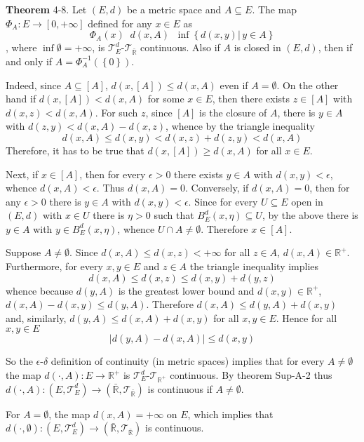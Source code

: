 \documentclass[a4paper]{article}
\newcommand{\obj}[1]{\left\{ #1 \right \}}
\newcommand{\clo}[1]{\left [ #1 \right ]}
\newcommand{\brac}[1]{\left ( #1 \right )}
\newcommand{\induc}[1]{\left . #1 \right \vert}
\newcommand{\abs}[1]{\left | #1 \right |}
\newcommand{\Rbar}{{\bar{\mathbb{R}}}}
\newcommand{\Real}{\mathbb{R}}
\newcommand{\Zinf}{\clo{ 0, +\infty }}
\newcommand{\Tcal}{\mathcal{T}}
\newcommand{\defn}{\mathop{\overset{\Delta}{=}}\nolimits}
\begin{document}
\label{thm:set_dist} \noindent \textbf{Theorem} 4-8.
Let $\brac{E,d}$ be a metric space and $A\subseteq E$. The map $\Phi_A:E\to \Zinf$ defined for any $x\in E$ as \[\Phi_A\brac{x}\defn d\brac{x,A}\defn \inf\obj{\induc{d\brac{x,y}}\,y\in A}\], where $\inf \emptyset = +\infty$, is $\Tcal_E^d$-$\Tcal_\Rbar$ continuous. Also if $A$ is closed in $\brac{E, d}$, then if and only if $A=\Phi_A^{-1}\brac{\obj{0}}$.

Indeed, since $A\subseteq \clo{A}$, $d\brac{x,\clo{A}}\leq d\brac{x,A}$ even if $A=\emptyset$. On the other hand if $d\brac{x,\clo{A}} < d\brac{x,A}$ for some $x\in E$, then there exists $z\in\clo{A}$ with $d\brac{x,z}<d\brac{x,A}$. For such $z$, since $\clo{A}$ is the closure of $A$, there is $y\in A$ with $d\brac{z,y}<d\brac{x,A}-d\brac{x,z}$, whence by the triangle inequality \[d\brac{x,A}\leq d\brac{x,y} < d\brac{x,z}+d\brac{z,y} < d\brac{x, A}\] Therefore, it has to be true that $d\brac{x,\clo{A}} \geq d\brac{x,A}$ for all $x\in E$.

Next, if $x\in \clo{A}$, then for every $\epsilon>0$ there exists $y\in A$ with $d\brac{x,y}<\epsilon$, whence $d\brac{x,A}<\epsilon$. Thus $d\brac{x,A}=0$. Conversely, if $d\brac{x,A}=0$, then for any $\epsilon>0$ there is $y\in A$ with $d\brac{x,y}<\epsilon$. Since for every $U\subseteq E$ open in $\brac{E,d}$ with $x\in U$ there is $\eta>0$ such that $B^d_E\brac{x,\eta}\subseteq U$, by the above there is $y\in A$ with $y\in B^d_E\brac{x,\eta}$, whence $U\cap A\neq \emptyset$. Therefore $x\in \clo{A}$.

Suppose $A\neq \emptyset$. Since $d\brac{x,A}\leq d\brac{x,z}<+\infty$ for all $z\in A$, $d\brac{x,A}\in \Real^+$. Furthermore, for every $x,y\in E$ and $z\in A$ the triangle inequality implies \[d\brac{x, A}\leq d\brac{x,z}\leq d\brac{x,y}+d\brac{y,z}\] whence because $d\brac{y,A}$ is the greatest lower bound and $d\brac{x,y}\in \Real^+$, $d\brac{x,A}-d\brac{x,y}\leq d\brac{y,A}$. Therefore $d\brac{x,A}\leq d\brac{y,A}+d\brac{x,y}$ and, similarly, $d\brac{y,A}\leq d\brac{x,A}+d\brac{x,y}$ for all $x,y\in E$. Hence for all $x,y\in E$ \[\abs{ d\brac{y,A}-d\brac{x,A}} \leq d\brac{x,y}\]

So the $\epsilon$-$\delta$ definition of continuity (in metric spaces) implies that for every $A\neq \emptyset$ the map $d\brac{\cdot,A}:E\to\Real^+$ is $\Tcal_E^d$-$\Tcal_{\Real^+}$ continuous. By theorem Sup-A-2 thus $d\brac{\cdot,A}:\brac{E, \Tcal_E^d}\to\brac{\Rbar, \Tcal_\Rbar}$ is continuous if $A\neq \emptyset$.

For $A=\emptyset$, the map $d\brac{x,A}=+\infty$ on $E$, which implies that $d\brac{\cdot, \emptyset}:\brac{E, \Tcal_E^d}\to\brac{\Rbar, \Tcal_\Rbar}$ is continuous.
\end{document}
